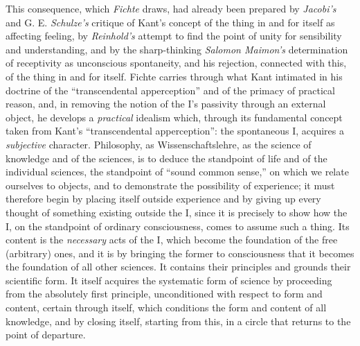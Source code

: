 This consequence, which \emph{Fichte} draws, had already been prepared
by \emph{Jacobi's} and G. E. \emph{Schulze's} critique of Kant's
concept of the thing in and for itself as affecting feeling, by
\emph{Reinhold's} attempt to find the point of unity for sensibility and
understanding, and by the sharp-thinking \emph{Salomon Maimon's}
determination of receptivity as unconscious spontaneity, and his
rejection, connected with this, of the thing in and for itself. Fichte
carries through what Kant intimated in his doctrine of the
``transcendental apperception'' and of the primacy of practical reason,
and, in removing the notion of the I's passivity through an external
object, he develops a \emph{practical} idealism which, through its
fundamental concept taken from Kant's ``transcendental apperception'':
the spontaneous I, acquires a \emph{subjective} character. Philosophy,
as Wissenschaftslehre, as the science of knowledge and of the sciences,
is to deduce the standpoint of life and of the individual sciences, the
standpoint of ``sound common sense,'' on which we relate ourselves to
objects, and to demonstrate the possibility of experience; it must
therefore begin by placing itself outside experience and by giving up
every thought of something existing outside the I, since it is
precisely to show how the I, on the standpoint of ordinary
consciousness, comes to assume such a thing. Its content is the
\emph{necessary} acts of the I, which become the foundation of the free
(arbitrary) ones, and it is by bringing the former to consciousness
that it becomes the foundation of all other sciences. It contains their
principles and grounds their scientific form. It itself acquires the
systematic form of science by proceeding from the absolutely first
principle, unconditioned with respect to form and content, certain
through itself, which conditions the form and content of all knowledge,
and by closing itself, starting from this, in a circle that returns to
the point of departure.

